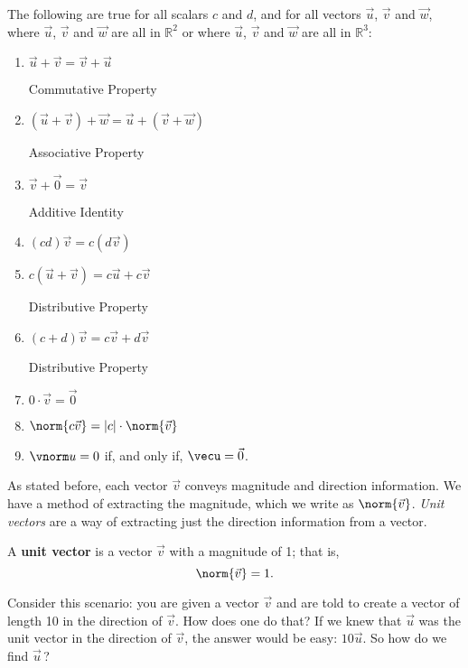 {The following are true for all scalars $c$ and $d$, and for all vectors $\vec u$, $\vec v$ and $\vec w$, where $\vec u$, $\vec v$ and $\vec w$ are all in $\mathbb{R}^2$ or where $\vec u$, $\vec v$ and $\vec w$ are all in $\mathbb{R}^3$:
\begin{enumerate}
	\item \parbox{150pt}{$\vec u+\vec v = \vec v+\vec u$}Commutative Property
	\item \parbox{150pt}{$(\vec u+\vec v)+\vec w = \vec u+(\vec v+\vec w)$}Associative Property
	\item \parbox{150pt}{$\vec v+\vec 0 = \vec v$}Additive Identity
	\item \parbox{150pt}{$(cd)\vec v= c(d\vec v)$}
	\item \parbox{150pt}{$c(\vec u+\vec v) = c\vec u+c\vec v$}Distributive Property
	\item \parbox{150pt}{$(c+d)\vec v = c\vec v+d\vec v$}Distributive Property
	\item \parbox{150pt}{$0\cdot\vec v = \vec 0$}
	\item	\parbox{150pt}{$\norm{c\vec v} = |c|\cdot\norm{\vec v}$}\label{thm:norm_prop}
	\item	$\vnorm u = 0$ if, and only if, $\vecu = \vec 0$.  \label{thm:zero_norm}
\end{enumerate}
}

%

As stated before, each vector $\vec v$ conveys magnitude and direction information. We have a method of extracting the magnitude, which we write as $\norm{\vec v}$. \textit{Unit vectors} are a way of extracting just the direction information from a vector.

{A \textbf{unit vector} is a vector $\vec v$ with a magnitude of 1; that is, 
$$\norm{\vec v}=1.$$
}

Consider this scenario: you are given a vector $\vec v$ and are told to create a vector of length 10 in the direction of $\vec v$. How does one do that? If we knew that $\vec u$ was the unit vector in the direction of $\vec v$, the answer would be easy: $10\vec u$. So how do we find $\vec u$\,?

